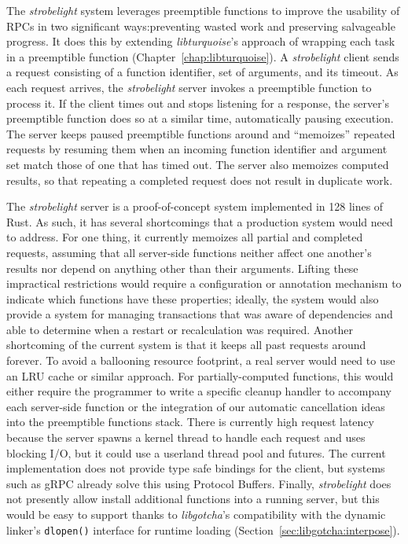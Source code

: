 The \textit{strobelight} system leverages preemptible functions to improve the
usability of RPCs in two significant ways:\@ preventing wasted work and preserving
salvageable progress.  It does this by extending \textit{libturquoise}'s approach of
wrapping each task in a preemptible function (Chapter~\ref{chap:libturquoise}).  A
\textit{strobelight} client sends a request consisting of a function identifier, set
of arguments, and its timeout.  As each request arrives, the \textit{strobelight}
server invokes a preemptible function to process it.  If the client times out and
stops listening for a response, the server's preemptible function does so at a
similar time, automatically pausing execution.  The server keeps paused preemptible
functions around and ``memoizes'' repeated requests by resuming them when an incoming
function identifier and argument set match those of one that has timed out.  The
server also memoizes computed results, so that repeating a completed request does not
result in duplicate work.

The \textit{strobelight} server is a proof-of-concept system implemented in 128 lines
of Rust.  As such, it has several shortcomings that a production system would need to
address.  For one thing, it currently memoizes all partial and completed requests,
assuming that all server-side functions neither affect one another's results nor
depend on anything other than their arguments.  Lifting these impractical
restrictions would require a configuration or annotation mechanism to indicate which
functions have these properties; ideally, the system would also provide a system for
managing transactions that was aware of dependencies and able to determine when a
restart or recalculation was required.  Another shortcoming of the current system is
that it keeps all past requests around forever.  To avoid a ballooning resource
footprint, a real server would need to use an LRU cache or similar approach.  For
partially-computed functions, this would either require the programmer to write a
specific cleanup handler to accompany each server-side function or the integration of
our automatic cancellation ideas into the preemptible functions stack.  There is
currently high request latency because the server spawns a kernel thread to handle
each request and uses blocking I/O, but it could use a userland thread pool and
futures.  The current
implementation does not provide type safe bindings for the client, but systems such
as gRPC already solve this using Protocol Buffers.  Finally, \textit{strobelight}
does not presently allow install additional functions into a running server, but this
would be easy to support thanks to \textit{libgotcha}'s compatibility with the
dynamic linker's \texttt{dlopen()} interface for runtime loading
(Section~\ref{sec:libgotcha:interpose}).
